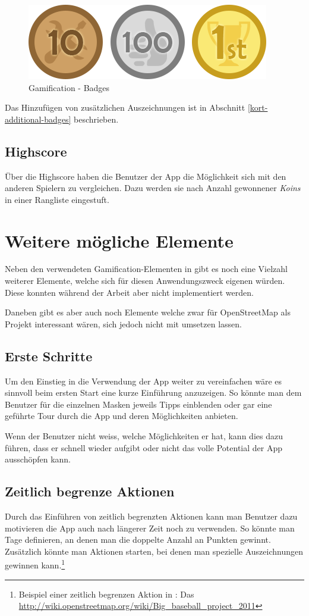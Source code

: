 \begin{figure}[H]
	\centering
	\includegraphics[scale=0.7]{images/gamification/gamification-badges}
	\caption{Gamification - Badges}
	\label{gamification-badges}
\end{figure}

Das Hinzufügen von zusätzlichen Auszeichnungen ist in Abschnitt \ref{kort-additional-badges} beschrieben.

\subsection{Highscore}
Über die Highscore haben die Benutzer der App die Möglichkeit sich mit den anderen Spielern zu vergleichen.
Dazu werden sie nach Anzahl gewonnener \emph{Koins} in einer Rangliste eingestuft.

\section{Weitere mögliche Elemente}
Neben den verwendeten Gamification-Elementen in \kort gibt es noch eine Vielzahl weiterer Elemente, welche sich für diesen Anwendungszweck eigenen würden.
Diese konnten während der Arbeit aber nicht implementiert werden.

Daneben gibt es aber auch noch Elemente welche zwar für OpenStreetMap als Projekt interessant wären, sich jedoch nicht mit \kort umsetzen lassen.

\subsection{Erste Schritte}
Um den Einstieg in die Verwendung der App weiter zu vereinfachen wäre es sinnvoll beim ersten Start eine kurze Einführung anzuzeigen.
So könnte man dem Benutzer für die einzelnen Masken jeweils Tipps einblenden oder gar eine geführte Tour durch die App und deren Möglichkeiten anbieten.

Wenn der Benutzer nicht weiss, welche Möglichkeiten er hat, kann dies dazu führen, dass er schnell wieder aufgibt oder nicht das volle Potential der App ausschöpfen kann.

\subsection{Zeitlich begrenze Aktionen}
Durch das Einführen von zeitlich begrenzten Aktionen kann man Benutzer dazu motivieren die App auch nach längerer Zeit noch zu verwenden.
So könnte man Tage definieren, an denen man die doppelte Anzahl an Punkten gewinnt.
Zusätzlich könnte man Aktionen starten, bei denen man spezielle Auszeichnungen gewinnen kann.\footnote{Beispiel einer zeitlich begrenzen Aktion in : Das  \url{http://wiki.openstreetmap.org/wiki/Big_baseball_project_2011}}

